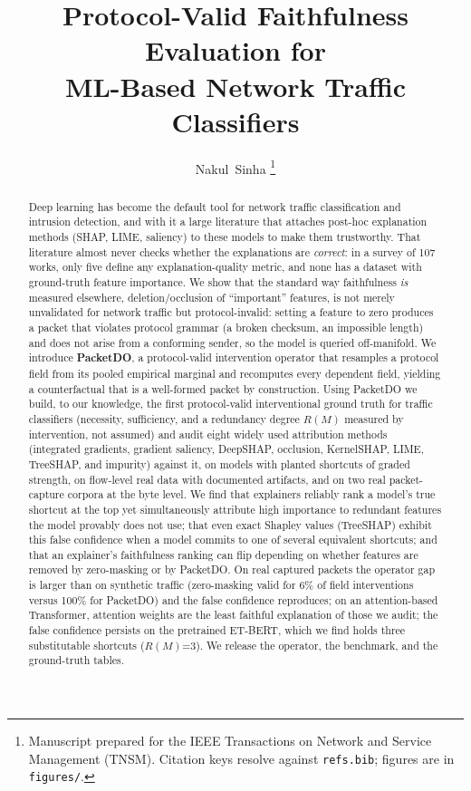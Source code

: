 \documentclass[journal]{IEEEtran}
\begin{document}
\title{Protocol-Valid Faithfulness Evaluation for\\ ML-Based Network Traffic Classifiers}
\author{Nakul~Sinha%
\thanks{Manuscript prepared for the IEEE Transactions on Network and Service Management (TNSM). Citation keys resolve against \texttt{refs.bib}; figures are in \texttt{figures/}.}}

\maketitle

\begin{abstract}
Deep learning has become the default tool for network traffic
classification and intrusion detection, and with it a large literature
that attaches post-hoc explanation methods (SHAP, LIME, saliency) to
these models to make them trustworthy. That literature almost never
checks whether the explanations are \emph{correct}: in a survey of 107
works, only five define any explanation-quality metric, and none has a
dataset with ground-truth feature importance. We show that the standard
way faithfulness \emph{is} measured elsewhere, deletion/occlusion of
``important'' features, is not merely unvalidated for network traffic
but protocol-invalid: setting a feature to zero produces a packet that
violates protocol grammar (a broken checksum, an impossible length) and
does not arise from a conforming sender, so the model is queried
off-manifold. We introduce \textbf{PacketDO}, a protocol-valid
intervention operator that resamples a protocol field from its pooled
empirical marginal and recomputes every dependent field, yielding a
counterfactual that is a well-formed packet by construction. Using
PacketDO we build, to our knowledge, the first protocol-valid
interventional ground truth for traffic classifiers (necessity,
sufficiency, and a redundancy degree $R(M)$ measured by intervention, not
assumed) and audit eight widely used attribution methods (integrated
gradients, gradient saliency, DeepSHAP, occlusion, KernelSHAP, LIME,
TreeSHAP, and impurity) against it, on models with planted shortcuts of
graded strength, on flow-level real data with documented artifacts, and
on two real packet-capture corpora at the byte level. We find that
explainers reliably rank a model's true shortcut at the top yet
simultaneously attribute high importance to redundant features the model
provably does not use; that even exact Shapley values (TreeSHAP) exhibit
this false confidence when a model commits to one of several equivalent
shortcuts; and that an explainer's faithfulness ranking can flip
depending on whether features are removed by zero-masking or by
PacketDO. On real captured packets the operator gap is larger than on
synthetic traffic (zero-masking valid for 6\% of field interventions
versus 100\% for PacketDO) and the false confidence reproduces; on an
attention-based Transformer, attention weights are the least faithful
explanation of those we audit; the false confidence persists on the
pretrained ET-BERT, which we find holds three substitutable shortcuts
($R(M)$=3). We release the operator, the benchmark, and the ground-truth
tables.
\end{abstract}
\end{document}
